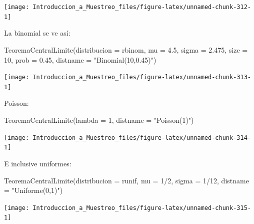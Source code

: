 \documentclass[
]{book}
\newenvironment{Shaded}{\begin{snugshade}}{\end{snugshade}}
\newcommand{\AttributeTok}[1]{\textcolor[rgb]{0.77,0.63,0.00}{#1}}
\newcommand{\DecValTok}[1]{\textcolor[rgb]{0.00,0.00,0.81}{#1}}
\newcommand{\FloatTok}[1]{\textcolor[rgb]{0.00,0.00,0.81}{#1}}
\newcommand{\FunctionTok}[1]{\textcolor[rgb]{0.00,0.00,0.00}{#1}}
\newcommand{\NormalTok}[1]{#1}
\newcommand{\SpecialCharTok}[1]{\textcolor[rgb]{0.00,0.00,0.00}{#1}}
\newcommand{\StringTok}[1]{\textcolor[rgb]{0.31,0.60,0.02}{#1}}
\begin{document}
\begin{center}\texttt{[image: Introduccion\_a\_Muestreo\_files/figure-latex/unnamed-chunk-312-1]} \end{center}

La binomial se ve así:

\begin{Shaded}
\begin{Highlighting}[]
\FunctionTok{TeoremaCentralLimite}\NormalTok{(}\AttributeTok{distribucion =}\NormalTok{ rbinom, }\AttributeTok{mu =} \FloatTok{4.5}\NormalTok{, }\AttributeTok{sigma =} \FloatTok{2.475}\NormalTok{, }\AttributeTok{size =} \DecValTok{10}\NormalTok{, }
                     \AttributeTok{prob =} \FloatTok{0.45}\NormalTok{, }\AttributeTok{distname =} \StringTok{"Binomial(10,0.45)"}\NormalTok{)}
\end{Highlighting}
\end{Shaded}

\begin{center}\texttt{[image: Introduccion\_a\_Muestreo\_files/figure-latex/unnamed-chunk-313-1]} \end{center}

Poisson:

\begin{Shaded}
\begin{Highlighting}[]
\FunctionTok{TeoremaCentralLimite}\NormalTok{(}\AttributeTok{lambda =} \DecValTok{1}\NormalTok{, }\AttributeTok{distname =} \StringTok{"Poisson(1)"}\NormalTok{)}
\end{Highlighting}
\end{Shaded}

\begin{center}\texttt{[image: Introduccion\_a\_Muestreo\_files/figure-latex/unnamed-chunk-314-1]} \end{center}

E inclusive uniformes:

\begin{Shaded}
\begin{Highlighting}[]
\FunctionTok{TeoremaCentralLimite}\NormalTok{(}\AttributeTok{distribucion =}\NormalTok{ runif, }\AttributeTok{mu =} \DecValTok{1}\SpecialCharTok{/}\DecValTok{2}\NormalTok{, }\AttributeTok{sigma =} \DecValTok{1}\SpecialCharTok{/}\DecValTok{12}\NormalTok{, }
                     \AttributeTok{distname =} \StringTok{"Uniforme(0,1)"}\NormalTok{)}
\end{Highlighting}
\end{Shaded}

\begin{center}\texttt{[image: Introduccion\_a\_Muestreo\_files/figure-latex/unnamed-chunk-315-1]} \end{center}
\end{document}
